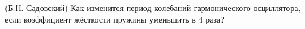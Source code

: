 (Б.Н. Садовский)
Как изменится период колебаний гармонического осциллятора, если
коэффициент жёсткости пружины уменьшить в $4$ раза?
